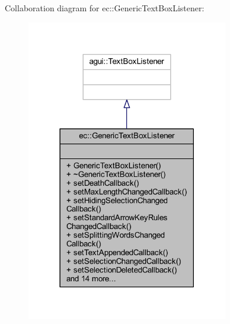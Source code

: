 Collaboration diagram for ec\+:\+:Generic\+Text\+Box\+Listener\+:\nopagebreak
\begin{figure}[H]
\begin{center}
\leavevmode
\includegraphics[width=249pt]{classec_1_1_generic_text_box_listener__coll__graph}
\end{center}
\end{figure}
